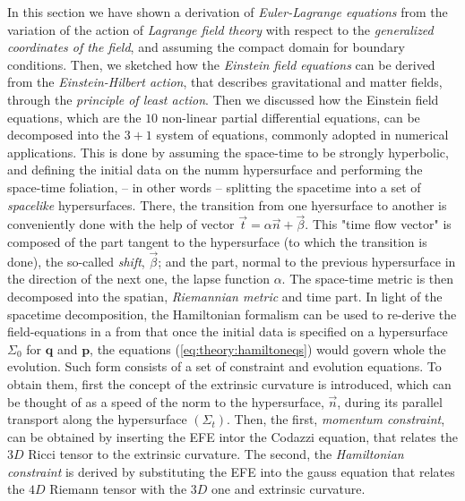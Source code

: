 In this section we have shown a derivation of \textit{Euler-Lagrange equations} from the variation of the action of \textit{Lagrange field theory} with respect to the \textit{generalized coordinates of the field}, and assuming the compact domain for boundary conditions.
Then, we sketched how the \textit{Einstein field equations} can be derived from the \textit{Einstein-Hilbert action}, that describes gravitational and matter fields, through the \textit{principle of least action}.
Then we discussed how the Einstein field equations, which are the $10$ non-linear partial differential equations, can be decomposed into the $3+1$ system of equations, commonly adopted in numerical applications.
This is done by assuming the space-time to be strongly hyperbolic, and defining the initial data on the numm hypersurface and performing the space-time foliation, -- in other words -- splitting the spacetime into a set of \textit{spacelike} hypersurfaces.
There, the transition from one hyersurface to another is conveniently done with the help of vector $\vec{t} = \alpha\vec{n}+\vec{\beta}$. This "time flow vector" is composed of the part tangent to the hypersurface (to which the transition is done), the so-called \textit{shift}, $\vec{\beta}$; and the part, normal to the previous hypersurface in the direction of the next one, the lapse function $\alpha$. 
The space-time metric is then decomposed into the spatian, \textit{Riemannian metric} and time part.
In light of the spacetime decomposition, the Hamiltonian formalism can be used to re-derive the field-equations in a from that once the initial data is specified on a hypersurface $\Sigma_0$ for $\boldsymbol{q}$ and $\boldsymbol{p}$, the equations (\ref{eq:theory:hamiltoneqs}) would govern whole the evolution. 
Such form consists of a set of constraint and evolution equations.
To obtain them, first the concept of the extrinsic curvature is introduced, which can be thought of as a speed of the norm to the hypersurface, $\vec{n}$, during its parallel transport along the hypersurface $(\Sigma_t)$.
Then, the first, \textit{momentum constraint}, can be obtained by inserting the EFE intor the Codazzi equation, that relates the $3D$ Ricci tensor to the extrinsic curvature. 
The second, the \textit{Hamiltonian constraint} is derived by substituting the EFE into the gauss equation that relates the $4D$ Riemann tensor with the $3D$ one and extrinsic curvature.
